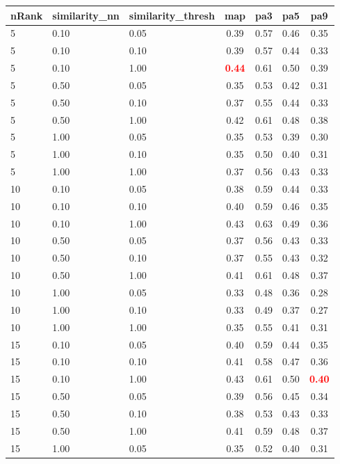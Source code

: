   
\begin{table} 
\begin{center} 
\scriptsize 
 \setlength{\tabcolsep}{.16667em} 
\begin{tabular}{lllcccc} 
nRank & similarity\_nn & similarity\_thresh & map & pa3 & pa5 & pa9 \\ 
\hline 
 5 & 0.10 & 0.05 & 0.39 & 0.57 & 0.46 & 0.35 \\ 
 5 & 0.10 & 0.10 & 0.39 & 0.57 & 0.44 & 0.33 \\ 
 5 & 0.10 & 1.00 & \textbf{\textcolor{red}{0.44}} & 0.61 & 0.50 & 0.39 \\ 
 5 & 0.50 & 0.05 & 0.35 & 0.53 & 0.42 & 0.31 \\ 
 5 & 0.50 & 0.10 & 0.37 & 0.55 & 0.44 & 0.33 \\ 
 5 & 0.50 & 1.00 & 0.42 & 0.61 & 0.48 & 0.38 \\ 
 5 & 1.00 & 0.05 & 0.35 & 0.53 & 0.39 & 0.30 \\ 
 5 & 1.00 & 0.10 & 0.35 & 0.50 & 0.40 & 0.31 \\ 
 5 & 1.00 & 1.00 & 0.37 & 0.56 & 0.43 & 0.33 \\ 
10 & 0.10 & 0.05 & 0.38 & 0.59 & 0.44 & 0.33 \\ 
10 & 0.10 & 0.10 & 0.40 & 0.59 & 0.46 & 0.35 \\ 
10 & 0.10 & 1.00 & 0.43 & 0.63 & 0.49 & 0.36 \\ 
10 & 0.50 & 0.05 & 0.37 & 0.56 & 0.43 & 0.33 \\ 
10 & 0.50 & 0.10 & 0.37 & 0.55 & 0.43 & 0.32 \\ 
10 & 0.50 & 1.00 & 0.41 & 0.61 & 0.48 & 0.37 \\ 
10 & 1.00 & 0.05 & 0.33 & 0.48 & 0.36 & 0.28 \\ 
10 & 1.00 & 0.10 & 0.33 & 0.49 & 0.37 & 0.27 \\ 
10 & 1.00 & 1.00 & 0.35 & 0.55 & 0.41 & 0.31 \\ 
15 & 0.10 & 0.05 & 0.40 & 0.59 & 0.44 & 0.35 \\ 
15 & 0.10 & 0.10 & 0.41 & 0.58 & 0.47 & 0.36 \\ 
15 & 0.10 & 1.00 & 0.43 & 0.61 & 0.50 & \textbf{\textcolor{red}{0.40}} \\ 
15 & 0.50 & 0.05 & 0.39 & 0.56 & 0.45 & 0.34 \\ 
15 & 0.50 & 0.10 & 0.38 & 0.53 & 0.43 & 0.33 \\ 
15 & 0.50 & 1.00 & 0.41 & 0.59 & 0.48 & 0.37 \\ 
15 & 1.00 & 0.05 & 0.35 & 0.52 & 0.40 & 0.31 \\ 

\end{tabular}
\end{center}
\end{table}
